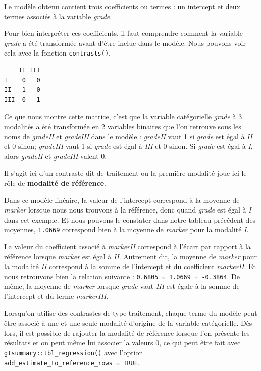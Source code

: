 \documentclass[
  letterpaper,
  DIV=11,
  numbers=noendperiod,
  oneside]{scrreprt}
\newenvironment{Shaded}{\begin{snugshade}}{\end{snugshade}}
\newcommand{\FunctionTok}[1]{\textcolor[rgb]{0.28,0.35,0.67}{#1}}
\newcommand{\NormalTok}[1]{\textcolor[rgb]{0.00,0.23,0.31}{#1}}
\newcommand{\SpecialCharTok}[1]{\textcolor[rgb]{0.37,0.37,0.37}{#1}}
\begin{document}
Le modèle obtenu contient trois coefficients ou termes : un intercept et
deux termes associés à la variable \emph{grade}.

Pour bien interpréter ces coefficients, il faut comprendre comment la
variable \emph{grade} a été transformée avant d'être inclue dans le
modèle. Nous pouvons voir cela avec la fonction \texttt{contrasts()}.

\begin{Shaded}
\end{Shaded}

\begin{verbatim}
    II III
I    0   0
II   1   0
III  0   1
\end{verbatim}

Ce que nous montre cette matrice, c'est que la variable catégorielle
\emph{grade} à 3 modalités a été transformée en 2 variables binaires que
l'on retrouve sous les noms de \emph{gradeII} et \emph{gradeIII} dans le
modèle : \emph{gradeII} vaut 1 si \emph{grade} est égal à \emph{II} et 0
sinon; \emph{gradeIII} vaut 1 si \emph{grade} est égal à \emph{III} et 0
sinon. Si \emph{grade} est égal à \emph{I}, alors \emph{gradeII} et
\emph{gradeIII} valent 0.

Il s'agit ici d'un contraste dit de traitement ou la première modalité
joue ici le rôle de \textbf{modalité de référence}.

Dans ce modèle linéaire, la valeur de l'intercept correspond à la
moyenne de \emph{marker} lorsque nous nous trouvons à la référence, donc
quand \emph{grade} est égal à \emph{I} dans cet exemple. Et nous pouvons
le constater dans notre tableau précédent des moyennes, \texttt{1.0669}
correspond bien à la moyenne de \emph{marker} pour la modalité \emph{I}.

La valeur du coefficient associé à \emph{markerII} correspond à l'écart
par rapport à la référence lorsque \emph{marker} est égal à \emph{II}.
Autrement dit, la moyenne de \emph{marker} pour la modalité \emph{II}
correspond à la somme de l'intercept et du coefficient \emph{markerII}.
Et nous retrouvons bien la relation suivante :
\texttt{0.6805\ =\ 1.0669\ +\ -0.3864}. De même, la moyenne de
\emph{marker} lorsque \emph{grade} vaut \emph{III} est égale à la somme
de l'intercept et du terme \emph{markerIII}.

Lorsqu'on utilise des contrastes de type traitement, chaque terme du
modèle peut être associé à une et une seule modalité d'origine de la
variable catégorielle. Dès lors, il est possible de rajouter la modalité
de référence lorsque l'on présente les résultats et on peut même lui
associer la valeurs 0, ce qui peut être fait avec
\texttt{gtsummary::tbl\_regression()} avec l'option
\texttt{add\_estimate\_to\_reference\_rows\ =\ TRUE}.
\end{document}
